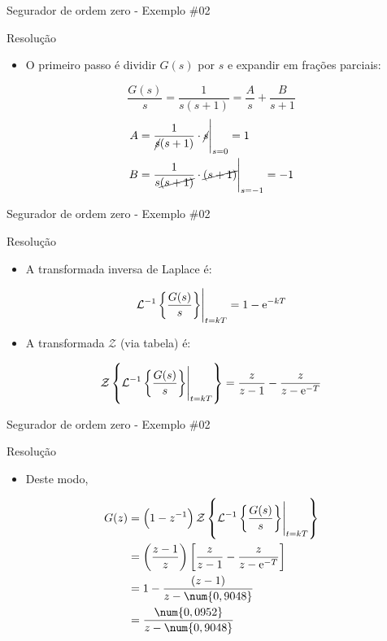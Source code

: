 \begin{frame}{Segurador de ordem zero - Exemplo \#02}
\begin{block}{Resolução}
\begin{itemize}
    \item O primeiro passo é dividir $G(s)$ por $s$ e expandir em frações parciais:
\end{itemize}
$$\dfrac{G(s)}{s}=\dfrac{1}{s(s+1)}=\dfrac{A}{s}+\dfrac{B}{s+1}$$
\begin{align*}
A&=\eval{\dfrac{1}{\cancel{s}(s+1)}\cdot \cancel{s}}_{s=0}=1 \\ B&=\eval{\dfrac{1}{s\cancel{(s+1)}}\cdot\cancel{(s+1)}}_{s=-1}=-1 \\
\end{align*}
\end{block}
\end{frame}

\begin{frame}{Segurador de ordem zero - Exemplo \#02}
\begin{block}{Resolução}
\begin{itemize}
    \item A transformada inversa de Laplace é:
\end{itemize}
$$\eval{\mathcal{L}^{-1}\left\lbrace \dfrac{G(s)}{s} \right\rbrace}_{t=kT} = 1-\text{e}^{-kT}$$
\begin{itemize}
    \item A transformada $\mathcal{Z}$ (via tabela) é:
\end{itemize}
$$\mathcal{Z}\left\lbrace \eval{\mathcal{L}^{-1}\left\lbrace \dfrac{G(s)}{s} \right\rbrace}_{t=kT}\right\rbrace = \dfrac{z}{z-1} -\dfrac{z}{z-\text{e}^{-T}}$$
\end{block}
\end{frame}

\begin{frame}{Segurador de ordem zero - Exemplo \#02}
\begin{block}{Resolução}
\begin{itemize}
    \item Deste modo,
\end{itemize}
\begin{align*}
    G(z)&=\left( 1-z^{-1}\right) \mathcal{Z}\left\lbrace \eval{\mathcal{L}^{-1}\left\lbrace \dfrac{G(s)}{s} \right\rbrace}_{t=kT}\right\rbrace \\
    &=\left(\dfrac{z-1}{z}\right) \left[ \dfrac{z}{z-1} -\dfrac{z}{z-\text{e}^{-T}} \right] \\
    &=1-\dfrac{(z-1)}{z-\num{0,9048}} \\
    &=\dfrac{\num{0,0952}}{z-\num{0,9048}}
\end{align*}
\end{block}
\end{frame}

